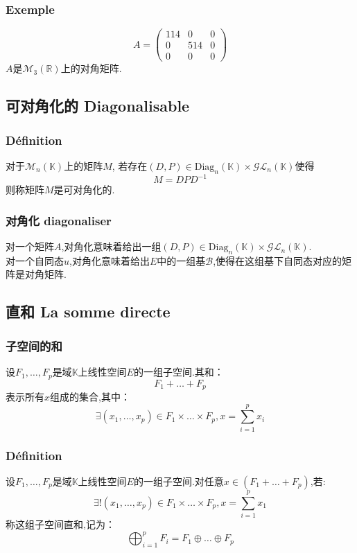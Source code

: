 \documentclass[12pt, a4paper, oneside]{ctexbook}
\newcommand{\R }{\mathbb{R}}%
\begin{document}
  \subsubsection{Exemple}
  $$
  A=\begin{pmatrix} 114 & 0 & 0 \\ 0 & 514 & 0 \\ 0 & 0 & 0 \end{pmatrix}
  $$
  $A$是$\mathcal{M}_3(\R)$上的对角矩阵.
  \subsection{可对角化的 Diagonalisable}
  \subsubsection{Définition}
  对于$\mathcal{M}_n(\mathbb{K})$上的矩阵$M$,
  若存在$(D,P)\in\mbox{Diag}_n(\mathbb{K})\times\mathcal{G} \mathcal{L} _n(\mathbb{K})$使得
  $$
  M=DPD^{-1}
  $$
  则称矩阵$M$是可对角化的.
  \subsubsection{对角化 diagonaliser}
  对一个矩阵$A$,对角化意味着给出一组$(D,P)\in\mbox{Diag}_n(\mathbb{K})\times\mathcal{G} \mathcal{L} _n(\mathbb{K})$.\\

  对一个自同态$u$,对角化意味着给出$E$中的一组基$\mathcal{B}$,使得在这组基下自同态对应的矩阵是对角矩阵.
  \subsection{直和 La somme directe}
  \subsubsection{子空间的和}
  设$F_1,\dots,F_p$是域$\mathbb{K}$上线性空间$E$的一组子空间.其和：
  $$
  F_1+\dots+F_p
  $$
  表示所有$x$组成的集合,其中：
  $$
  \exists(x_1,\dots,x_p)\in F_1\times\dots\times F_p, x=\sum_{i=1}^{p}x_i
  $$
  \subsubsection{Définition}
  设$F_1,\dots,F_p$是域$\mathbb{K}$上线性空间$E$的一组子空间.对任意$x\in(F_1+\dots+F_p)$,若:
  $$
    \exists!(x_1,\dots,x_p)\in F_1\times\dots\times F_p,  
    x=\sum_{i=1}^{p}x_1
  $$
  称这组子空间直和,记为：
  $$
    \bigoplus _{i=1}^pF_i=F_1\oplus\dots\oplus F_p
  $$
\end{document}
